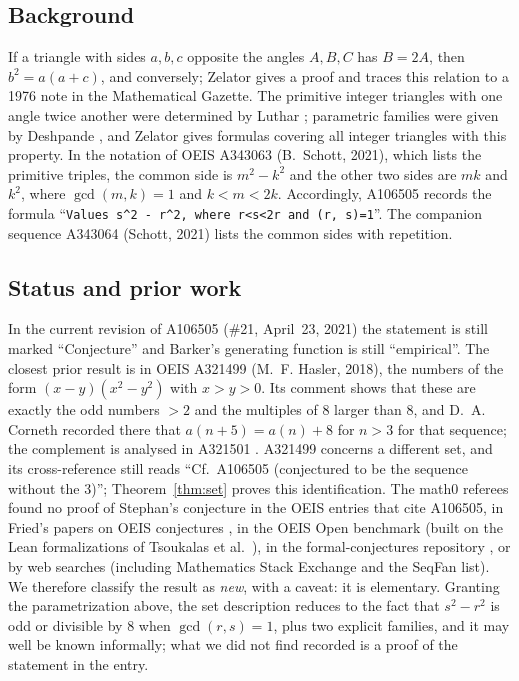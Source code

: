 \documentclass[11pt]{amsart}
\theoremstyle{plain}
\theoremstyle{definition}
\begin{document}
\subsection*{Background}
If a triangle with sides $a,b,c$ opposite the angles $A,B,C$ has $B=2A$, then $b^2=a(a+c)$, and conversely; Zelator \cite{Ze} gives a proof and traces this relation to a 1976 note in the Mathematical Gazette. The primitive integer triangles with one angle twice another were determined by Luthar \cite{Lu}; parametric families were given by Deshpande \cite{De}, and Zelator \cite{Ze} gives formulas covering all integer triangles with this property. In the notation of OEIS A343063 \cite{A343063} (B.~Schott, 2021), which lists the primitive triples, the common side is $m^2-k^2$ and the other two sides are $mk$ and $k^2$, where $\gcd(m,k)=1$ and $k<m<2k$. Accordingly, A106505 records the formula ``\verb|Values s^2 - r^2, where r<s<2r and (r, s)=1|''. The companion sequence A343064 \cite{A343064} (Schott, 2021) lists the common sides with repetition.

\subsection*{Status and prior work}
In the current revision of A106505 (\#21, April~23, 2021) the statement is still marked ``Conjecture'' and Barker's generating function is still ``empirical''. The closest prior result is in OEIS A321499 \cite{A321499} (M.~F. Hasler, 2018), the numbers of the form $(x-y)(x^2-y^2)$ with $x>y>0$. Its comment shows that these are exactly the odd numbers $>2$ and the multiples of $8$ larger than $8$, and D.~A. Corneth recorded there that $a(n+5)=a(n)+8$ for $n>3$ for that sequence; the complement is analysed in A321501 \cite{A321501}. A321499 concerns a different set, and its cross-reference still reads ``Cf.\ A106505 (conjectured to be the sequence without the 3)''; Theorem~\ref{thm:set} proves this identification. The math0 referees found no proof of Stephan's conjecture in the OEIS entries that cite A106505, in Fried's papers on OEIS conjectures \cite{Fr24,Fr26}, in the OEIS Open benchmark \cite{Ad} (built on the Lean formalizations of Tsoukalas et al.\ \cite{APN}), in the formal-conjectures repository \cite{FC}, or by web searches (including Mathematics Stack Exchange and the SeqFan list). We therefore classify the result as \emph{new}, with a caveat: it is elementary. Granting the parametrization above, the set description reduces to the fact that $s^2-r^2$ is odd or divisible by $8$ when $\gcd(r,s)=1$, plus two explicit families, and it may well be known informally; what we did not find recorded is a proof of the statement in the entry.
\end{document}
